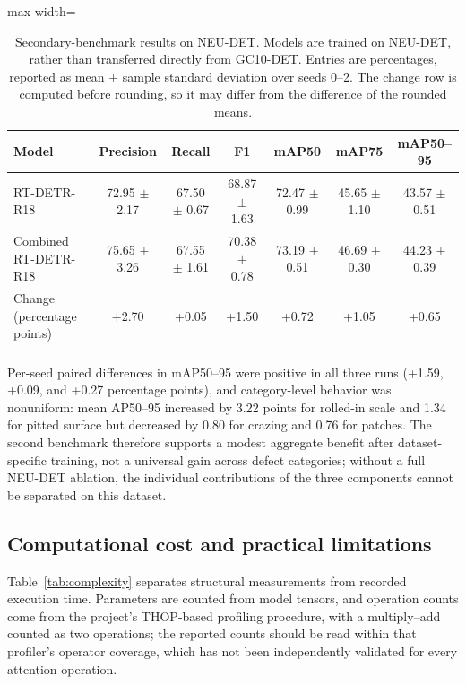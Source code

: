 \documentclass[pdflatex,sn-mathphys-num,iicol]{sn-jnl}
\begin{document}
\begin{table}[t]
\centering
\caption{Secondary-benchmark results on NEU-DET. Models are trained on NEU-DET, rather than transferred directly from GC10-DET. Entries are percentages, reported as mean $\pm$ sample standard deviation over seeds 0--2. The change row is computed before rounding, so it may differ from the difference of the rounded means.}
\label{tab:neu}
\scriptsize
\setlength{\tabcolsep}{4pt}
\begin{adjustbox}{max width=\textwidth}
\begin{tabular}{@{}lcccccc@{}}
\toprule
Model & Precision & Recall & F1 & mAP50 & mAP75 & mAP50--95 \\
\midrule
RT-DETR-R18 & 72.95 $\pm$ 2.17 & 67.50 $\pm$ 0.67 & 68.87 $\pm$ 1.63 & 72.47 $\pm$ 0.99 & 45.65 $\pm$ 1.10 & 43.57 $\pm$ 0.51 \\
Combined RT-DETR-R18 & 75.65 $\pm$ 3.26 & 67.55 $\pm$ 1.61 & 70.38 $\pm$ 0.78 & 73.19 $\pm$ 0.51 & 46.69 $\pm$ 0.30 & 44.23 $\pm$ 0.39 \\
\midrule
Change (percentage points) & +2.70 & +0.05 & +1.50 & +0.72 & +1.05 & +0.65 \\
\botrule
\end{tabular}
\end{adjustbox}
\end{table}

Per-seed paired differences in mAP50--95 were positive in all three runs (+1.59, +0.09, and +0.27 percentage points), and category-level behavior was nonuniform: mean AP50--95 increased by 3.22 points for rolled-in scale and 1.34 for pitted surface but decreased by 0.80 for crazing and 0.76 for patches. The second benchmark therefore supports a modest aggregate benefit after dataset-specific training, not a universal gain across defect categories; without a full NEU-DET ablation, the individual contributions of the three components cannot be separated on this dataset.

\subsection{Computational cost and practical limitations}\label{sec:complexity}

Table~\ref{tab:complexity} separates structural measurements from recorded execution time. Parameters are counted from model tensors, and operation counts come from the project's THOP-based profiling procedure, with a multiply--add counted as two operations; the reported counts should be read within that profiler's operator coverage, which has not been independently validated for every attention operation.
\end{document}
